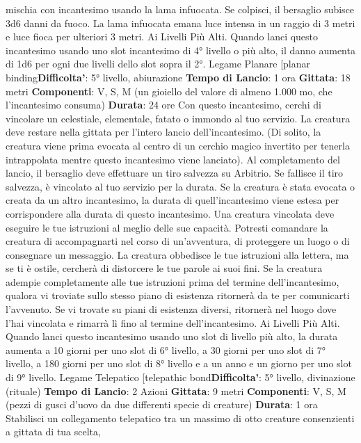 \begin{multicols}{2}
mischia con incantesimo usando la lama infuocata. Se
colpisci, il bersaglio subisce 3d6 danni da fuoco.
La lama infuocata emana luce intensa in un raggio di 3
metri e luce fioca per ulteriori 3 metri.
Ai Livelli Più Alti. Quando lanci questo incantesimo
usando uno slot incantesimo di 4° livello o più alto, il
danno aumenta di 1d6 per ogni due livelli dello slot
sopra il 2°.
Legame Planare
[planar binding\textbf{Difficolta'}:
5° livello, abiurazione
\textbf{Tempo di Lancio}: 1 ora
\textbf{Gittata}: 18 metri
\textbf{Componenti}: V, S, M (un gioiello del valore di almeno
1.000 mo, che l’incantesimo consuma)
\textbf{Durata}: 24 ore
Con questo incantesimo, cerchi di vincolare un
celestiale, elementale, fatato o immondo al tuo servizio.
La creatura deve restare nella gittata per l’intero lancio
dell’incantesimo. (Di solito, la creatura viene prima
evocata al centro di un cerchio magico invertito per
tenerla intrappolata mentre questo incantesimo viene
lanciato). Al completamento del lancio, il bersaglio deve
effettuare un tiro salvezza su Arbitrio. Se fallisce il tiro
salvezza, è vincolato al tuo servizio per la durata. Se la
creatura è stata evocata o creata da un altro
incantesimo, la durata di quell’incantesimo viene estesa
per corrispondere alla durata di questo incantesimo.
Una creatura vincolata deve eseguire le tue istruzioni al
meglio delle sue capacità. Potresti comandare la
creatura di accompagnarti nel corso di un’avventura, di
proteggere un luogo o di consegnare un messaggio. La
creatura obbedisce le tue istruzioni alla lettera, ma se ti
è ostile, cercherà di distorcere le tue parole ai suoi fini.
Se la creatura adempie completamente alle tue
istruzioni prima del termine dell’incantesimo, qualora vi
troviate sullo stesso piano di esistenza ritornerà da te
per comunicarti l’avvenuto. Se vi trovate su piani di
esistenza diversi, ritornerà nel luogo dove l’hai vincolata
e rimarrà lì fino al termine dell’incantesimo.
Ai Livelli Più Alti. Quando lanci questo incantesimo
usando uno slot di livello più alto, la durata aumenta a
10 giorni per uno slot di 6° livello, a 30 giorni per uno
slot di 7° livello, a 180 giorni per uno slot di 8° livello e a
un anno e un giorno per uno slot di 9° livello.
Legame Telepatico
[telepathic bond\textbf{Difficolta'}:
5° livello, divinazione (rituale)
\textbf{Tempo di Lancio}: 2 Azioni
\textbf{Gittata}: 9 metri
\textbf{Componenti}: V, S, M (pezzi di gusci d’uovo da due
differenti specie di creature)
\textbf{Durata}: 1 ora
Stabilisci un collegamento telepatico tra un massimo di
otto creature consenzienti a gittata di tua scelta,

\end{multicols}
